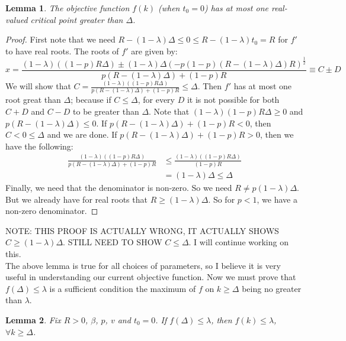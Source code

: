 \documentclass{article}
\newtheorem{lemma}{Lemma}[section]
\begin{document}
\begin{lemma} The objective function $f(k)$ (when $t_0 = 0$) has at most one real-valued critical point greater than $\Delta$. \end{lemma}
\begin{proof}
First note that we need $R-(1-\lambda)\Delta \leq 0 \leq R-(1-\lambda)t_0 = R$ for $f'$ to have real roots. The roots of $f'$ are given by:
\begin{equation*}
x = \frac{(1-\lambda)((1-p)R\Delta) \pm (1-\lambda)\Delta(-p(1-p)(R-(1-\lambda)\Delta)R)^{\frac{1}{2}}}{p(R-(1-\lambda)\Delta)+(1-p)R} \equiv C\pm D
\end{equation*}
We will show that $C = 
\frac{(1-\lambda)((1-p)R\Delta)}{p(R-(1-\lambda)\Delta)+(1-p)R} \leq \Delta$. Then $f'$ has at most one root great than $\Delta$; because if $C \leq \Delta$, for every $D$ it is not possible for both $C+D$ and $C-D$ to be greater than $\Delta$. Note that $(1-\lambda)(1-p)R\Delta \geq 0$ and $p(R-(1-\lambda)\Delta) \leq 0$. If $p(R-(1-\lambda)\Delta)+(1-p)R < 0$, then $C < 0 \leq \Delta$ and we are done. If $p(R-(1-\lambda)\Delta)+(1-p)R > 0$, then we have the following:
\begin{align*}
\frac{(1-\lambda)((1-p)R\Delta)}{p(R-(1-\lambda)\Delta)+(1-p)R} &\leq \frac{(1-\lambda)((1-p)R\Delta)}{(1-p)R} \\
&= (1-\lambda)\Delta \leq \Delta
\end{align*}
Finally, we need that the denominator is non-zero. So we need $R \neq p(1-\lambda)\Delta$. But we already have for real roots that $R \geq (1-\lambda)\Delta$. So for $p < 1$, we have a non-zero denominator.
\end{proof}

NOTE: THIS PROOF IS ACTUALLY WRONG, IT ACTUALLY SHOWS $C \geq (1-\lambda)\Delta$. STILL NEED TO SHOW $C \leq \Delta$. I will continue working on this. \\

The above lemma is true for all choices of parameters, so I believe it is very useful in understanding our current objective function. Now we must prove that $f(\Delta) \leq \lambda$ is a sufficient condition the maximum of $f$ on $k\geq \Delta$ being no greater than $\lambda$.

\begin{lemma}
Fix $R > 0$, $\beta$, $p$, $v$ and $t_0 = 0$. If $f(\Delta) \leq \lambda$, then $f(k) \leq \lambda$, $\forall k \geq \Delta$. 
\end{lemma}
\end{document}
